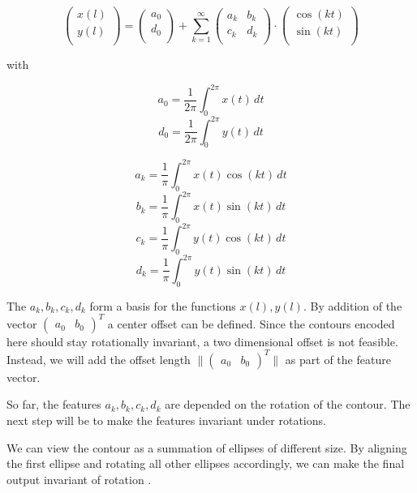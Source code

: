 $$
\begin{pmatrix}
  x(l) \\
  y(l) \\
\end{pmatrix}
=
\begin{pmatrix}
  a_0 \\
  d_0 \\
\end{pmatrix}
+
\sum_{k=1}^\infty 
\begin{pmatrix}
  a_k & b_k\\
  c_k & d_k\\
\end{pmatrix}
\cdot
\begin{pmatrix}
  \cos(kt)\\
  \sin(kt)\\
\end{pmatrix}
$$

with

$$
a_0 = \frac{1}{2\pi} \int_{0}^{2 \pi}  x(t) \,dt 
$$
$$
d_0 = \frac{1}{2\pi} \int_{0}^{2 \pi}  y(t) \,dt 
$$

$$
a_k = \frac{1}{\pi} \int_{0}^{2 \pi}  x(t) \cos(kt) \,dt 
$$
$$
b_k = \frac{1}{\pi} \int_{0}^{2 \pi}  x(t) \sin(kt) \,dt 
$$
$$
c_k = \frac{1}{\pi} \int_{0}^{2 \pi}  y(t) \cos(kt) \,dt 
$$
$$
d_k = \frac{1}{\pi} \int_{0}^{2 \pi}  y(t) \sin(kt )\,dt 
$$

The $a_k, b_k, c_k, d_k$ form a basis for the functions $x(l), y(l)$.
By addition of the vector $ \begin{pmatrix} a_0 & b_0 \end{pmatrix}^T $ a center offset can be defined.
Since the contours encoded here should stay rotationally invariant, a two dimensional offset is not feasible.
Instead, we will add the offset length $\|  \begin{pmatrix} a_0 & b_0 \end{pmatrix}^T \| $ as part of the feature vector.

So far, the features $a_k, b_k, c_k, d_k$ are depended on the rotation of the contour.
The next step will be to make the features invariant under rotations.

We can view the contour as a summation of ellipses of different size.
By aligning the first ellipse and rotating all other ellipses accordingly, we can make the final output invariant
of rotation \cite{MEBA}.


